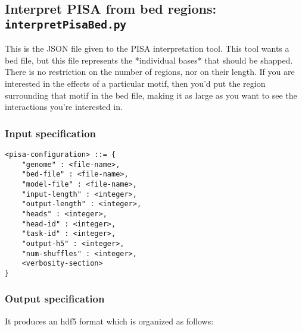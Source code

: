 \documentclass{article}
\begin{document}
\newpage
\subsection{Interpret PISA from bed regions: \texttt{interpretPisaBed.py}}

This is the JSON file given to the PISA interpretation tool. 
This tool wants a bed file, but this file represents the *individual bases* that should be shapped. 
There is no restriction on the number of regions, nor on their length. If you are interested in the effects of a particular motif, 
then you'd put the region surrounding that motif in the bed file, making it as large as you want to see the interactions you're interested in. 

\subsubsection{Input specification}

\begin{lstlisting}
<pisa-configuration> ::= {
    "genome" : <file-name>,
    "bed-file" : <file-name>,
    "model-file" : <file-name>,
    "input-length" : <integer>,
    "output-length" : <integer>,
    "heads" : <integer>,
    "head-id" : <integer>,
    "task-id" : <integer>,
    "output-h5" : <integer>,
    "num-shuffles" : <integer>,
    <verbosity-section>
}
\end{lstlisting}

\subsubsection{Output specification}

It produces an hdf5 format which is organized as follows:
\end{document}
